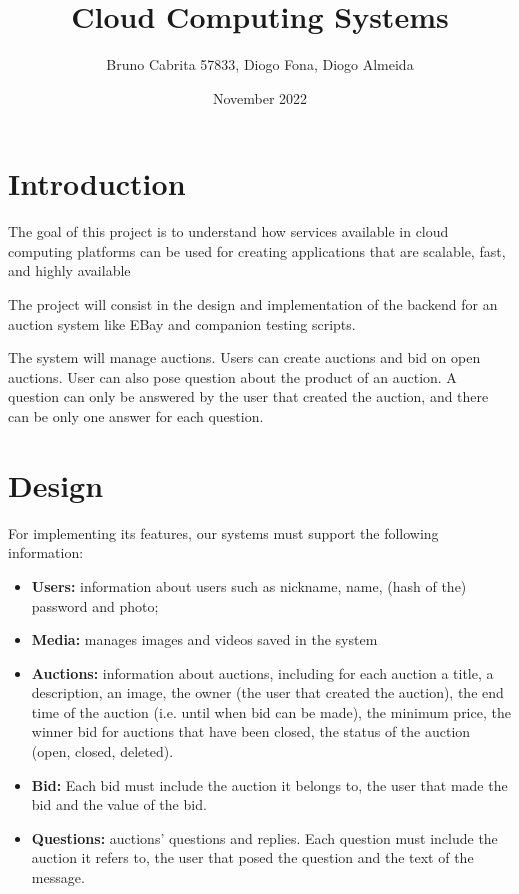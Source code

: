 \documentclass{article}
\title{Cloud Computing Systems}
\author{Bruno Cabrita 57833, Diogo Fona, Diogo Almeida}
\date{November 2022}
\begin{document}
\maketitle

\section{Introduction}
The goal of this project is to understand how services available in cloud computing
platforms can be used for creating applications that are scalable, fast, and highly
available

The project will consist in the design and implementation of the backend for an auction
system like EBay and companion testing scripts.

The system will manage auctions. Users can create auctions and bid on open auctions.
User can also pose question about the product of an auction. A question can only be
answered by the user that created the auction, and there can be only one answer for each
question.

\section{Design}
For implementing its features, our systems must support the following information:
\begin{itemize}
    \item \textbf{Users:} information about users such as nickname, name, (hash of the) password and photo;
    \item \textbf{Media:} manages images and videos saved in the system
    \item \textbf{Auctions:} information about auctions, including for each auction a title, a
description, an image, the owner (the user that created the auction), the end time
of the auction (i.e. until when bid can be made), the minimum price, the winner
bid for auctions that have been closed, the status of the auction (open, closed,
deleted).
    \item \textbf{Bid:} Each bid must include the auction it belongs to, the user that made the bid
and the value of the bid.
    \item \textbf{Questions:} auctions’ questions and replies. Each question must include the
auction it refers to, the user that posed the question and the text of the message.
\end{itemize}
\end{document}

